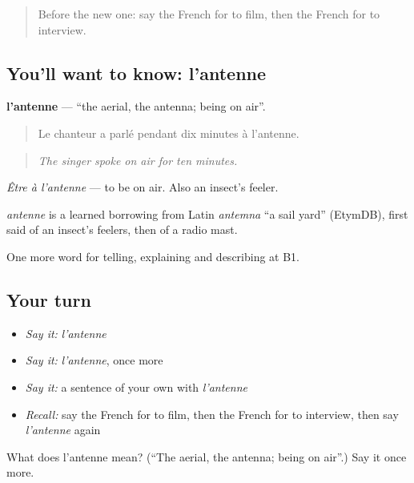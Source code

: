 \label{lesson:FR-C283-antenne}



\begin{quote}
Before the new one: say the French for to film, then the French for to interview.
\end{quote}

\subsection*{You'll want to know: l'antenne}
\textbf{l'antenne} — \textquotedblleft{}the aerial, the antenna; being on air\textquotedblright{}.

\begin{quote}
Le chanteur a parlé pendant dix minutes à l'antenne.
\end{quote}

\begin{quote}
\emph{The singer spoke on air for ten minutes.}
\end{quote}

\emph{Être à l'antenne} — to be on air. Also an insect's feeler.

\begin{cousinweb}
\emph{antenne} is a learned borrowing from Latin \emph{antemna} \textquotedblleft{}a sail yard\textquotedblright{} (EtymDB), first said of an insect's feelers, then of a radio mast.
\end{cousinweb}

\begin{grammarlens}[title={What you've built}]
One more word for telling, explaining and describing at B1.
\end{grammarlens}

\subsection*{Your turn}
\begin{itemize}
\raggedright
  \item \emph{Say it:} \emph{l'antenne}
  \item \emph{Say it:} \emph{l'antenne}, once more
  \item \emph{Say it:} a sentence of your own with \emph{l'antenne}
  \item \emph{Recall:} say the French for to film, then the French for to interview, then say \emph{l'antenne} again
\end{itemize}

\begin{tcolorbox}[breakable,colback=teal!4,colframe=teal!35!black,title={Before you move on}]
What does l'antenne mean? (\textquotedblleft{}The aerial, the antenna; being on air\textquotedblright{}.) Say it once more.
\end{tcolorbox}
